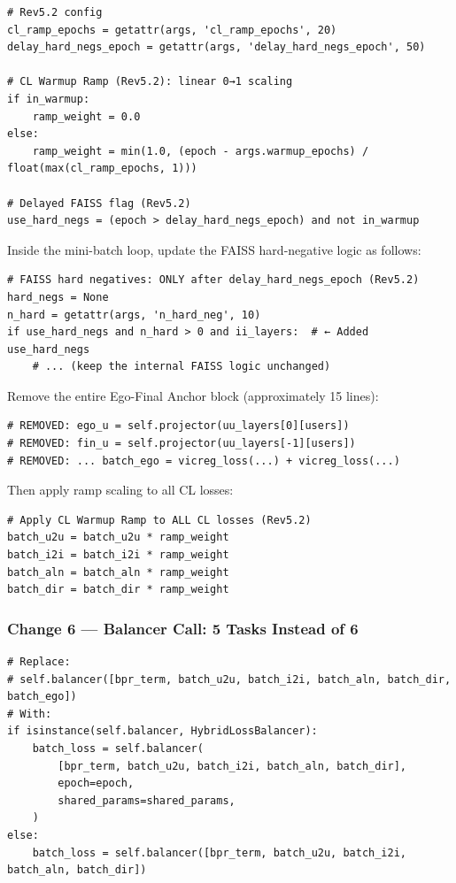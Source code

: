 \documentclass[11pt,a4paper]{article}
\begin{document}
\begin{lstlisting}[style=pythonstyle]
# Rev5.2 config
cl_ramp_epochs = getattr(args, 'cl_ramp_epochs', 20)
delay_hard_negs_epoch = getattr(args, 'delay_hard_negs_epoch', 50)

# CL Warmup Ramp (Rev5.2): linear 0→1 scaling
if in_warmup:
    ramp_weight = 0.0
else:
    ramp_weight = min(1.0, (epoch - args.warmup_epochs) / float(max(cl_ramp_epochs, 1)))

# Delayed FAISS flag (Rev5.2)
use_hard_negs = (epoch > delay_hard_negs_epoch) and not in_warmup
\end{lstlisting}

Inside the mini-batch loop, update the FAISS hard-negative logic as follows:

\begin{lstlisting}[style=pythonstyle]
# FAISS hard negatives: ONLY after delay_hard_negs_epoch (Rev5.2)
hard_negs = None
n_hard = getattr(args, 'n_hard_neg', 10)
if use_hard_negs and n_hard > 0 and ii_layers:  # ← Added use_hard_negs
    # ... (keep the internal FAISS logic unchanged)
\end{lstlisting}

Remove the entire Ego-Final Anchor block (approximately 15 lines):

\begin{lstlisting}[style=pythonstyle]
# REMOVED: ego_u = self.projector(uu_layers[0][users])
# REMOVED: fin_u = self.projector(uu_layers[-1][users])
# REMOVED: ... batch_ego = vicreg_loss(...) + vicreg_loss(...)
\end{lstlisting}

Then apply ramp scaling to all CL losses:

\begin{lstlisting}[style=pythonstyle]
# Apply CL Warmup Ramp to ALL CL losses (Rev5.2)
batch_u2u = batch_u2u * ramp_weight
batch_i2i = batch_i2i * ramp_weight
batch_aln = batch_aln * ramp_weight
batch_dir = batch_dir * ramp_weight
\end{lstlisting}

\subsubsection*{Change 6 --- Balancer Call: 5 Tasks Instead of 6}
\begin{lstlisting}[style=pythonstyle]
# Replace:
# self.balancer([bpr_term, batch_u2u, batch_i2i, batch_aln, batch_dir, batch_ego])
# With:
if isinstance(self.balancer, HybridLossBalancer):
    batch_loss = self.balancer(
        [bpr_term, batch_u2u, batch_i2i, batch_aln, batch_dir],
        epoch=epoch,
        shared_params=shared_params,
    )
else:
    batch_loss = self.balancer([bpr_term, batch_u2u, batch_i2i, batch_aln, batch_dir])
\end{lstlisting}
\end{document}
